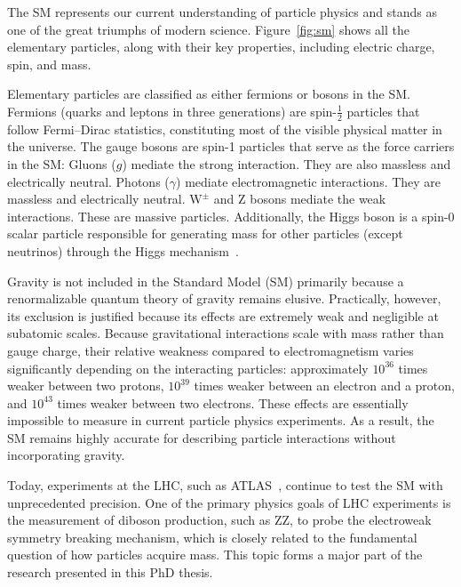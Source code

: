 The SM represents our current understanding of particle physics and stands as one of the great triumphs of modern science. Figure~\ref{fig:sm} shows all the elementary particles, along with their key properties, including electric charge, spin, and mass.

Elementary particles are classified as either fermions or bosons in the SM. Fermions (quarks and leptons in three generations) are spin-$\frac{1}{2}$ particles that follow Fermi--Dirac statistics, constituting most of the visible physical matter in the universe. 
The gauge bosons are spin-1 particles that serve as the force carriers in the SM:
Gluons ($g$) mediate the strong interaction. They are also massless and electrically neutral.
Photons ($\gamma$) mediate electromagnetic interactions. They are massless and electrically neutral.
$\text{W}^\pm$ and $\text{Z}$ bosons mediate the weak interactions. These are massive particles.
Additionally, the Higgs boson is a spin-0 scalar particle responsible for generating mass for other particles (except neutrinos) through the Higgs mechanism~\cite{Higgs1964,EnglertBrout1964,GuralnikHagenKibble1964}.

Gravity is not included in the Standard Model (SM) primarily because a renormalizable quantum theory of gravity remains elusive. Practically, however, its exclusion is justified because its effects are extremely weak and negligible at subatomic scales. Because gravitational interactions scale with mass rather than gauge charge, their relative weakness compared to electromagnetism varies significantly depending on the interacting particles: approximately $10^{36}$ times weaker between two protons, $10^{39}$ times weaker between an electron and a proton, and $10^{43}$ times weaker between two electrons. These effects are essentially impossible to measure in current particle physics experiments. As a result, the SM remains highly accurate for describing particle interactions without incorporating gravity.

Today, experiments at the LHC, such as ATLAS~\cite{ATLAS2008}, continue to test the SM with unprecedented precision.
One of the primary physics goals of LHC experiments is the measurement of diboson production, such as $\text{ZZ}$, to probe the electroweak symmetry breaking mechanism, which is closely related to the fundamental question of how particles acquire mass. This topic forms a major part of the research presented in this PhD thesis.



